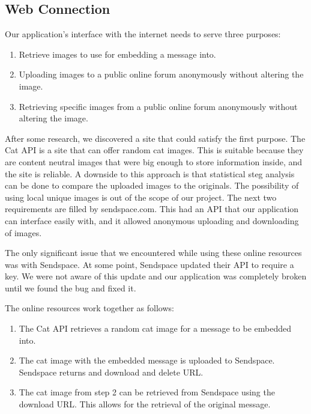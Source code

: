 \subsection{Web Connection}

Our application's interface with the internet needs to serve three purposes:
\begin{enumerate}
\item Retrieve images to use for embedding a message into. 
\item Uploading images to a public online forum anonymously without altering the image.
\item Retrieving specific images from a public online forum anonymously without altering the image. 
\end{enumerate}

After some research, we discovered a site that could satisfy the first purpose. The Cat API is a site that can offer random cat images. This is suitable because they are content neutral images that were big enough to store information inside, and the site is reliable. A downside to this approach is that statistical steg analysis can be done to compare the uploaded images to the originals. The possibility of using local unique images is out of the scope of our project. The next two requirements are filled by sendspace.com. This had an API that our application can interface easily with, and it allowed anonymous uploading and downloading of images. 

The only significant issue that we encountered while using these online resources was with Sendspace. At some point, Sendspace updated their API to require a key. We were not aware of this update and our application was completely broken until we found the bug and fixed it.

The online resources work together as follows:
\begin{enumerate}
\item The Cat API retrieves a random cat image for a message to be embedded into.
\item The cat image with the embedded message is uploaded to Sendspace. Sendspace returns and download and delete URL.
\item The cat image from step 2 can be retrieved from Sendspace using the download URL. This allows for the retrieval of the original message. 
\end{enumerate}











